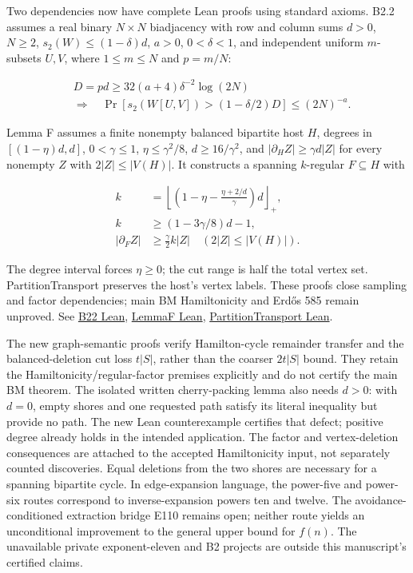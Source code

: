 \documentclass[smallextended]{svjour3}
\newcounter{none} %
\begin{document}
Two dependencies now have complete Lean proofs using standard axioms.
B2.2 assumes a real binary \(N\times N\) biadjacency with row and column
sums \(d>0\), \(N\ge2\), \(s_2(W)\le(1-\delta)d\), \(a>0\),
\(0<\delta<1\), and independent uniform \(m\)-subsets \(U,V\), where
\(1\le m\le N\) and \(p=m/N\):

\[
\begin{aligned}
&D=pd\ge32(a+4)\delta^{-2}\log(2N)\\
&\Longrightarrow\quad
\Pr\!\left[s_2(W[U,V])>(1-\delta/2)D\right]\le(2N)^{-a}.
\end{aligned}
\]

Lemma F assumes a finite nonempty balanced bipartite host \(H\), degrees
in \([(1-\eta)d,d]\), \(0<\gamma\le1\), \(\eta\le\gamma^2/8\),
\(d\ge16/\gamma^2\), and \(|\partial_H Z|\ge\gamma d|Z|\) for every
nonempty \(Z\) with \(2|Z|\le|V(H)|\). It constructs a spanning
\(k\)-regular \(F\subseteq H\) with

\[
\begin{aligned}
k&=\left\lfloor\left(1-\eta-\frac{\eta+2/d}{\gamma}\right)d\right\rfloor_{+},\\
k&\ge(1-3\gamma/8)d-1,\\
|\partial_F Z|&\ge\frac\gamma2 k|Z|
\quad(2|Z|\le|V(H)|).
\end{aligned}
\]

The degree interval forces \(\eta\ge0\); the cut range is half the total
vertex set. PartitionTransport preserves the host's vertex labels. These
proofs close sampling and factor dependencies; main BM Hamiltonicity and
Erdős 585 remain unproved. See
\href{https://github.com/alejandrozu/openmath-2026-judging/blob/70c5ec3107658182f22c207d4c50f53f9cb3e602/robert-review-2026-10-07/lean/B22.lean\#L26}{B22
Lean},
\href{https://github.com/alejandrozu/openmath-2026-judging/blob/70c5ec3107658182f22c207d4c50f53f9cb3e602/robert-review-2026-10-07/lean/LemmaF.lean\#L18}{LemmaF
Lean},
\href{https://github.com/alejandrozu/openmath-2026-judging/blob/70c5ec3107658182f22c207d4c50f53f9cb3e602/robert-review-2026-10-07/lean/PartitionTransport.lean\#L54}{PartitionTransport
Lean}.

The new graph-semantic proofs verify Hamilton-cycle remainder transfer
and the balanced-deletion cut loss \(t|S|\), rather than the coarser
\(2t|S|\) bound. They retain the Hamiltonicity/regular-factor premises
explicitly and do not certify the main BM theorem. The isolated written
cherry-packing lemma also needs \(d>0\): with \(d=0\), empty shores and
one requested path satisfy its literal inequality but provide no path.
The new Lean counterexample certifies that defect; positive degree
already holds in the intended application. The factor and
vertex-deletion consequences are attached to the accepted Hamiltonicity
input, not separately counted discoveries. Equal deletions from the two
shores are necessary for a spanning bipartite cycle. In edge-expansion
language, the power-five and power-six routes correspond to
inverse-expansion powers ten and twelve. The avoidance-conditioned
extraction bridge E110 remains open; neither route yields an
unconditional improvement to the general upper bound for \(f(n)\). The
unavailable private exponent-eleven and B2 projects are outside this
manuscript's certified claims.
\end{document}
